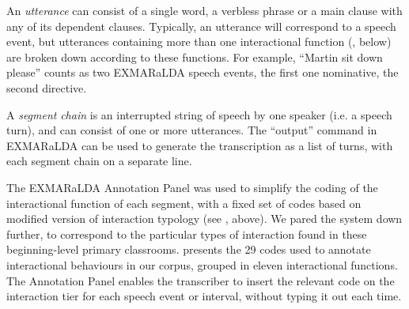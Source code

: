 \documentclass[output=paper,colorlinks,citecolor=brown,modfonts,nonflat]{../langscibook}
\begin{document}
An \textit{utterance} can consist of a single word, a verbless phrase or a main clause with any of its dependent clauses. Typically, an utterance will correspond to a speech event, but utterances containing more than one interactional function (, below) are broken down according to these functions. For example, “Martin {\textbar} sit down please” counts as two EXMARaLDA speech events, the first one nominative, the second directive.

A \textit{segment} \textit{chain} is an interrupted string of speech by one speaker (i.e. a speech turn), and can consist of one or more utterances. The “output” command in EXMARaLDA can be used to generate the transcription as a list of turns, with each segment chain on a separate line.

The EXMARaLDA Annotation Panel was used to simplify the coding of the interactional function of each segment, with a fixed set of codes based on  modified version of  interaction typology (see , above). We pared the system down further, to correspond to the particular types of interaction found in these beginning-level primary classrooms.  presents the 29 codes used to annotate interactional behaviours in our corpus, grouped in eleven interactional functions. The Annotation Panel enables the transcriber to insert the relevant code on the interaction tier for each speech event or interval, without typing it out each time.
\end{document}
